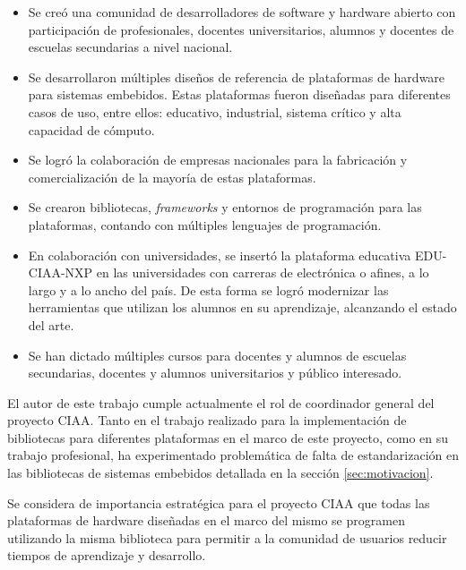 \begin{itemize}
\item
Se creó una comunidad de desarrolladores de software y hardware abierto con participación de profesionales, docentes universitarios, alumnos y docentes de escuelas secundarias a nivel nacional.
\item
Se desarrollaron múltiples diseños de referencia de plataformas de hardware para sistemas embebidos. Estas plataformas fueron diseñadas para diferentes casos de uso, entre ellos: educativo, industrial, sistema crítico y alta capacidad de cómputo.
\item
Se logró la colaboración de empresas nacionales para la fabricación y comercialización de la mayoría de estas plataformas.
\item
Se crearon bibliotecas, \emph{frameworks} y entornos de programación para las plataformas, contando con múltiples lenguajes de programación.
\item
En colaboración con universidades, se insertó la plataforma educativa EDU-CIAA-NXP en las universidades con carreras de electrónica o afines, a lo largo y a lo ancho del país. De esta forma se logró modernizar las herramientas que utilizan los alumnos en su aprendizaje, alcanzando el estado del arte.
\item
Se han dictado múltiples cursos para docentes y alumnos de escuelas secundarias, docentes y alumnos universitarios y público interesado.
\end{itemize}

El autor de este trabajo cumple actualmente el rol de coordinador general del proyecto CIAA. Tanto en el trabajo realizado para la implementación de bibliotecas para diferentes plataformas en el marco de este proyecto, como en su trabajo profesional, ha experimentado problemática de falta de estandarización en las bibliotecas de sistemas embebidos detallada en la sección \ref{sec:motivacion}.

Se considera de importancia estratégica para el proyecto CIAA que todas las plataformas de hardware diseñadas en el marco del mismo se programen utilizando la misma biblioteca para permitir a la comunidad de usuarios reducir tiempos de aprendizaje y desarrollo.

